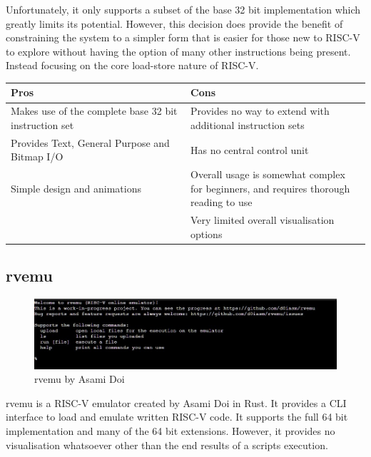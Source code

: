 Unfortunately, it only supports a subset of the base 32 bit implementation which greatly limits its potential. However, this decision does provide the benefit of constraining the system to a simpler form that is easier for those new to RISC-V to explore without having the option of many other instructions being present. Instead focusing on the core load-store nature of RISC-V.

\begin{table}[h]
\begin{tabular}{|p{0.5\linewidth} | p{0.5\linewidth}|}
\hline
\textbf{Pros}                                         & \textbf{Cons}                                                                         \\ \hline
Makes use of the complete base 32 bit instruction set & Provides no way to extend with additional instruction sets                            \\ \hline
Provides Text, General Purpose and Bitmap I/O         & Has no central control unit                                                           \\ \hline
Simple design and animations                          & Overall usage is somewhat complex for beginners, and requires thorough reading to use \\ \hline
                                                      &  Very limited overall visualisation options                                                                                      \\ \hline
\end{tabular}
\end{table}

\subsection{rvemu}
\begin{figure}[H]
    \centering
    \includegraphics[width=0.85\linewidth]{dissertation/DATA/RVEMU.jpg}
    \caption{rvemu by Asami Doi}
    \label{fig:rvemu}
\end{figure}
rvemu \cite{doi_2021_d0iasmrvemu} is a RISC-V emulator created by Asami Doi in Rust. It provides a CLI interface to load and emulate written RISC-V code. It supports the full 64 bit implementation and many of the 64 bit extensions. However, it provides no visualisation whatsoever other than the end results of a scripts execution.

